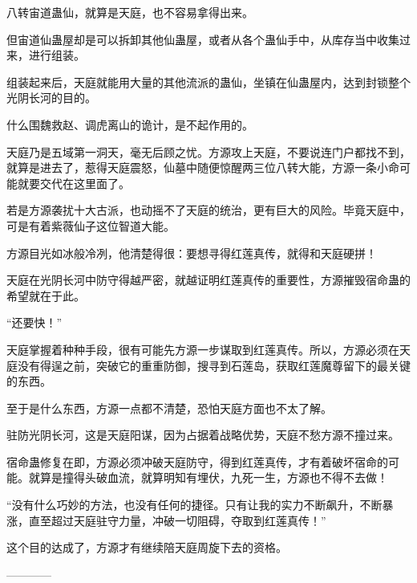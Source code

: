 \begin{this_body}
八转宙道蛊仙，就算是天庭，也不容易拿得出来。

但宙道仙蛊屋却是可以拆卸其他仙蛊屋，或者从各个蛊仙手中，从库存当中收集过来，进行组装。

组装起来后，天庭就能用大量的其他流派的蛊仙，坐镇在仙蛊屋内，达到封锁整个光阴长河的目的。

什么围魏救赵、调虎离山的诡计，是不起作用的。

天庭乃是五域第一洞天，毫无后顾之忧。方源攻上天庭，不要说连门户都找不到，就算是进去了，惹得天庭震怒，仙墓中随便惊醒两三位八转大能，方源一条小命可能就要交代在这里面了。

若是方源袭扰十大古派，也动摇不了天庭的统治，更有巨大的风险。毕竟天庭中，可是有着紫薇仙子这位智道大能。

方源目光如冰般冷冽，他清楚得很：要想寻得红莲真传，就得和天庭硬拼！

天庭在光阴长河中防守得越严密，就越证明红莲真传的重要性，方源摧毁宿命蛊的希望就在于此。

“还要快！”

天庭掌握着种种手段，很有可能先方源一步谋取到红莲真传。所以，方源必须在天庭没有得逞之前，突破它的重重防御，搜寻到石莲岛，获取红莲魔尊留下的最关键的东西。

至于是什么东西，方源一点都不清楚，恐怕天庭方面也不太了解。

驻防光阴长河，这是天庭阳谋，因为占据着战略优势，天庭不愁方源不撞过来。

宿命蛊修复在即，方源必须冲破天庭防守，得到红莲真传，才有着破坏宿命的可能。就算是撞得头破血流，就算明知有埋伏，九死一生，方源也不得不去做！

“没有什么巧妙的方法，也没有任何的捷径。只有让我的实力不断飙升，不断暴涨，直至超过天庭驻守力量，冲破一切阻碍，夺取到红莲真传！”

这个目的达成了，方源才有继续陪天庭周旋下去的资格。

------------

\end{this_body}

